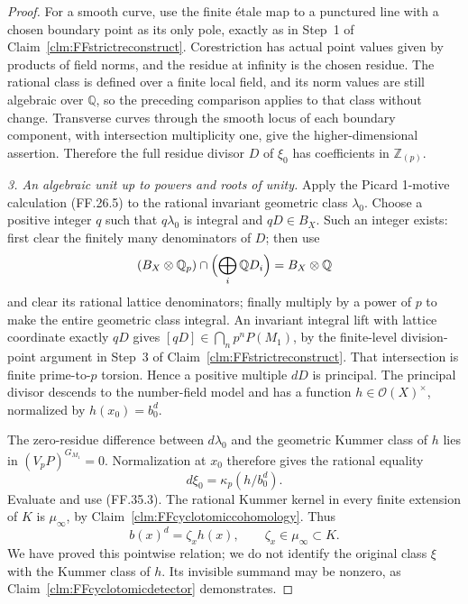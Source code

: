 \begin{proof}
For a smooth curve, use the finite \'etale map
to a punctured line with a chosen boundary
point as its only pole, exactly as in Step~1
of Claim~\ref{clm:FFstrictreconstruct}.
Corestriction has actual point values given by
products of field norms, and the residue at
infinity is the chosen residue. The rational
class is defined over a finite local field,
and its norm values are still algebraic over
\(\mathbb Q\), so the preceding comparison
applies to that class without change.
Transverse curves through the smooth locus
of each boundary component, with intersection
multiplicity one, give the higher-dimensional
assertion. Therefore the full residue divisor
\(D\) of \(\xi_0\) has coefficients in
\(\mathbb Z_{(p)}\).

\emph{3. An algebraic unit up to powers and roots of unity.}
Apply the Picard 1-motive calculation (FF.26.5)
to the rational invariant geometric class
\(\lambda_0\). Choose a positive integer \(q\)
such that \(q\lambda_0\) is integral and
\(qD\in B_X\). Such an integer exists:
first clear the finitely many denominators
of \(D\); then use
\[
 (B_X\otimes\mathbb Q_p)\cap
       \Bigl(\bigoplus_i\mathbb QD_i\Bigr)
                         = B_X\otimes\mathbb Q
\]
and clear its rational lattice denominators;
finally multiply by a power of \(p\) to make
the entire geometric class integral.
An invariant integral lift with lattice
coordinate exactly \(qD\) gives
\([qD]\in\bigcap_n p^nP(M_1)\), by the
finite-level division-point argument in
Step~3 of Claim~\ref{clm:FFstrictreconstruct}.
That intersection is finite prime-to-\(p\)
torsion. Hence a positive multiple \(dD\)
is principal. The principal divisor descends
to the number-field model and has a function
\(h\in\mathcal O(X)^\times\), normalized by
\(h(x_0)=b_0^d\).

The zero-residue difference between
\(d\lambda_0\) and the geometric Kummer class
of \(h\) lies in \((V_pP)^{G_{M_1}}=0\).
Normalization at \(x_0\) therefore gives the
rational equality
\[
                   d\xi_0=\kappa_p(h/b_0^d).
                                                        \tag{FF.35.6}
\]
Evaluate and use (FF.35.3). The rational
Kummer kernel in every finite extension of
\(K\) is \(\mu_\infty\), by
Claim~\ref{clm:FFcyclotomiccohomology}. Thus
\[
                b(x)^d=\zeta_xh(x),
                         \qquad \zeta_x\in\mu_\infty\subset K.
                                                        \tag{FF.35.7}
\]
We have proved this pointwise relation; we
do not identify the original class \(\xi\)
with the Kummer class of \(h\). Its invisible
summand may be nonzero, as Claim~\ref{clm:FFcyclotomicdetector}
demonstrates.


\end{proof}
